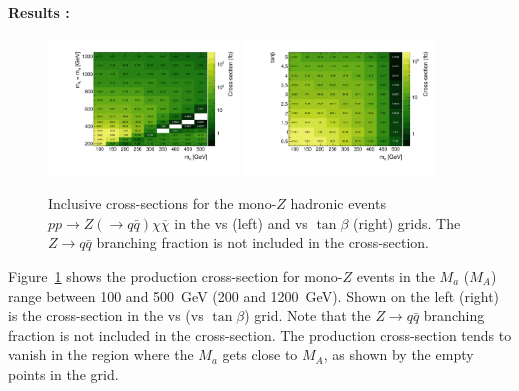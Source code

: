 \paragraph{Results :} 

\begin{figure}
\centering
\includegraphics[width=0.45\textwidth]{texinputs/04_grid/figures/monoz/hadronic/grid_mA_ma_xsec.pdf}
\includegraphics[width=0.45\textwidth]{texinputs/04_grid/figures/monoz/hadronic/grid_tanb_ma_xsec.pdf}
\caption{Inclusive cross-sections for the mono-$Z$ hadronic events 
$pp \rightarrow Z(\to q\bar{q})\chi\overline{\chi}$ in the \ma vs \mA (left) and \ma vs $\tan\beta$ (right) grids.
The $Z \to q\bar{q}$ branching fraction is not included in the cross-section.}
\label{fig:monozhad_inc_xsec_grid}
\end{figure}

Figure~\ref{fig:monozhad_inc_xsec_grid} shows the production cross-section for mono-$Z$ events 
in the $M_a$ ($M_A$) range between 100 and 500~GeV (200 and 1200~GeV). Shown on the left (right) is 
the cross-section in the \ma vs \mA (\ma vs $\tan\beta$) grid. Note that the $Z \to q\bar{q}$ branching fraction 
is not included in the cross-section. The production cross-section 
tends to vanish in the region where the $M_a$ gets close to $M_A$, as shown by the empty points in the grid.


